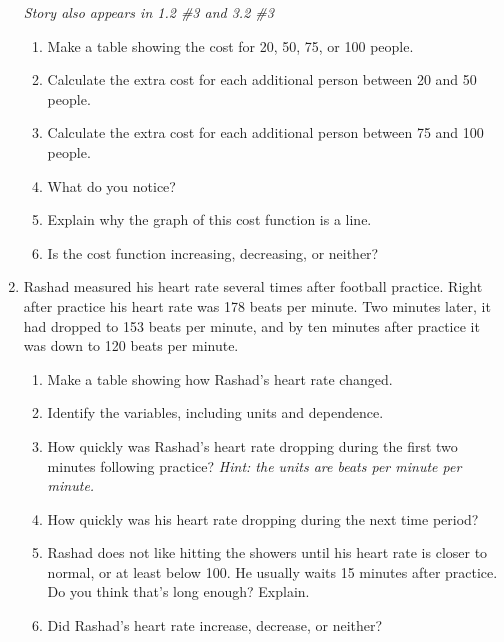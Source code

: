 \begin{enumerate}
 \hfill \emph{Story also appears in 1.2 \#3 and 3.2 \#3} 
\begin{enumerate}
\item Make a table showing the cost for 20, 50, 75, or 100 people. %
\vfill \vfill
\item Calculate the extra cost for each additional person between 20 and 50 people. \vfill
\item Calculate the extra cost  for each additional person between 75 and 100 people. \vfill
\item What do you notice? \vfill
\item Explain why the graph of this cost function is a line. \vfill
\item Is the cost function increasing, decreasing, or neither? \vfill
\end{enumerate}  

\newpage %

\item Rashad measured his heart rate several times after football practice.  Right after practice his heart rate was 178 beats per minute.  Two minutes later, it had dropped to 153 beats per minute, and by ten minutes after practice it was down to 120 beats per minute. %
\begin{enumerate}
\item Make a table showing how Rashad's heart rate changed. \vfill
\item Identify the variables, including units and dependence. \vfill
\item How quickly was Rashad's heart rate dropping during the first two minutes following practice?  \emph{Hint: the units are beats per minute per minute.} \vfill
\item How quickly was his heart rate dropping during the next time period? \vfill
\item Rashad does not like hitting the showers until  his heart rate is closer to normal, or at least below 100.  He usually waits 15 minutes after practice.  Do you think that's long enough?  Explain. \vfill
 \item Did Rashad's heart rate increase, decrease, or neither? \vfill
\end{enumerate} 
\newpage %


\end{enumerate}
